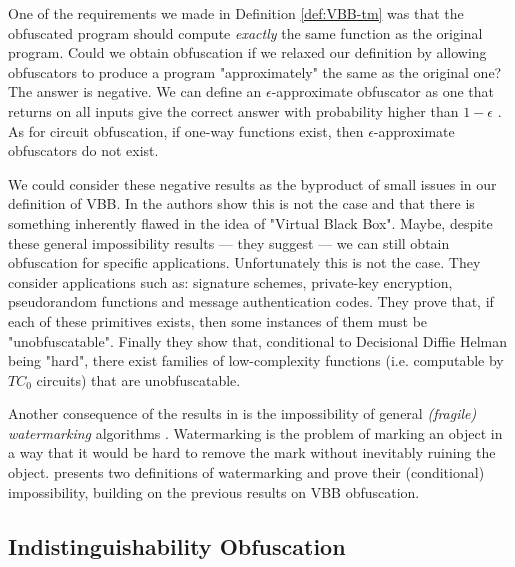 One of the requirements we made in Definition \ref{def:VBB-tm} was that the obfuscated program should compute \emph{exactly} the same function as the original program. Could we obtain obfuscation if we relaxed our definition by allowing obfuscators to produce a program "approximately" the same as the original one?
The answer is negative. We can define an $\epsilon$-approximate obfuscator as one that returns on all inputs give the correct answer with probability higher than $1-\epsilon$ \cite{VBB-imp}. As for circuit obfuscation, if one-way functions exist, then $\epsilon$-approximate obfuscators do not exist.

We could consider these negative results as the byproduct of small issues in our definition of VBB. In \cite{VBB-imp} the authors show this is not the case and that there is something inherently flawed in the idea of "Virtual Black Box". Maybe, despite these general impossibility results --- they suggest --- we can still obtain obfuscation for specific applications. Unfortunately this is not the case. They consider applications such as: signature schemes, private-key encryption, pseudorandom functions and message authentication codes. They prove that, if each of these primitives exists, then some instances of them must be "unobfuscatable".
Finally they show that, conditional to Decisional Diffie Helman being "hard", there exist families of low-complexity functions (i.e. computable by $TC_0$ circuits) that are unobfuscatable.

Another consequence of the results in \cite{VBB-imp} is the impossibility of general \emph{(fragile) watermarking} algorithms \cite{}. %
Watermarking is the problem of marking an object in a way that it would be hard to remove the mark without inevitably ruining the object. \cite{VBB-imp} presents two definitions of watermarking and prove their (conditional) impossibility, building on the previous results on VBB obfuscation.


\subsection{Indistinguishability Obfuscation}

